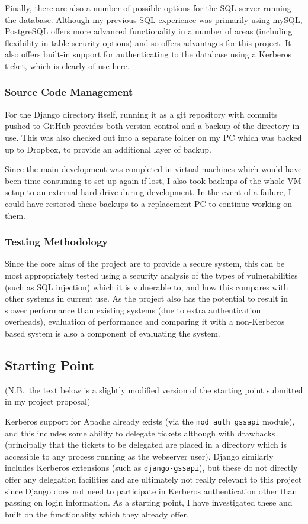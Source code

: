 \documentclass{article}
\begin{document}
Finally, there are also a number of possible options for the SQL server running the database. Although my previous SQL experience was primarily using mySQL, PostgreSQL offers more advanced functionality in a number of areas (including flexibility in table security options) and so offers advantages for this project. It also offers built-in support for authenticating to the database using a Kerberos ticket, which is clearly of use here.

\subsubsection{Source Code Management}
For the Django directory itself, running it as a git repository with commits pushed to GitHub provides both version control and a backup of the directory in use. This was also checked out into a separate folder on my PC which was backed up to Dropbox, to provide an additional layer of backup.

Since the main development was completed in virtual machines which would have been time-consuming to set up again if lost, I also took backups of the whole VM setup to an external hard drive during development. In the event of a failure, I could have restored these backups to a replacement PC to continue working on them.

\subsubsection{Testing Methodology}
Since the core aims of the project are to provide a secure system, this can be most appropriately tested using a security analysis of the types of vulnerabilities (such as SQL injection) which it is vulnerable to, and how this compares with other systems in current use. As the project also has the potential to result in slower performance than existing systems (due to extra authentication overheads), evaluation of performance and comparing it with a non-Kerberos based system is also a component of evaluating the system.

\subsection{Starting Point}
(N.B.\ the text below is a slightly modified version of the starting point submitted in my project proposal)

Kerberos support for Apache already exists (via the \verb+mod_auth_gssapi+ module), and this includes some ability to delegate tickets although with drawbacks (principally that the tickets to be delegated are placed in a directory which is accessible to any process running as the webserver user). Django similarly includes Kerberos extensions (such as \verb+django-gssapi+), but these do not directly offer any delegation facilities and are ultimately not really relevant to this project since Django does not need to participate in Kerberos authentication other than passing on login information. As a starting point, I have investigated these and built on the functionality which they already offer.
\end{document}
